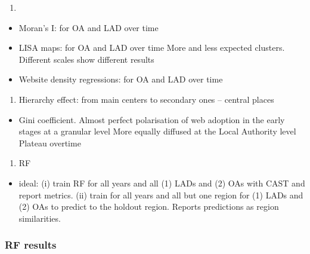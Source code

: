 \documentclass[
  authoryear,
  preprint,
  3p]{elsarticle}
\providecommand{\tightlist}{%
  \setlength{\itemsep}{0pt}\setlength{\parskip}{0pt}}\usepackage{longtable,booktabs,array}
\begin{document}
\begin{enumerate}
\def\labelenumi{\arabic{enumi})}
\setcounter{enumi}{1989}
\tightlist
\item
\end{enumerate}

\begin{itemize}
\item
  Moran's I: for OA and LAD over time
\item
  LISA maps: for OA and LAD over time More and less expected clusters.
  Different scales show different results
\item
  Website density regressions: for OA and LAD over time
\end{itemize}

\begin{enumerate}
\def\labelenumi{\arabic{enumi}.}
\setcounter{enumi}{3}
\tightlist
\item
  Hierarchy effect: from main centers to secondary ones -- central
  places
\end{enumerate}

\begin{itemize}
\tightlist
\item
  Gini coefficient. Almost perfect polarisation of web adoption in the
  early stages at a granular level More equally diffused at the Local
  Authority level Plateau overtime
\end{itemize}

\begin{enumerate}
\def\labelenumi{\arabic{enumi}.}
\setcounter{enumi}{4}
\tightlist
\item
  RF
\end{enumerate}

\begin{itemize}
\tightlist
\item
  ideal: (i) train RF for all years and all (1) LADs and (2) OAs with
  CAST and report metrics. (ii) train for all years and all but one
  region for (1) LADs and (2) OAs to predict to the holdout region.
  Reports predictions as region similarities.
\end{itemize}

\hypertarget{rf-results}{%
\subsubsection{RF results}\label{rf-results}}
\end{document}
